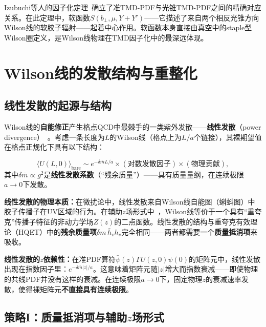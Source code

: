 \documentclass[12pt,a4paper]{ctexart}
\theoremstyle{definition}
\begin{document}
Izubuchi等人的因子化定理~\cite{Izubuchi2018}确立了准TMD-PDF与光锥TMD-PDF之间的精确对应关系。在此定理中，软函数$S(b_\perp, \mu, Y+Y')$——它描述了来自两个相反光锥方向Wilson线的软胶子辐射——起着中心作用。软函数本身直接由真空中的staple型Wilson圈定义，是Wilson线物理在TMD因子化中的最深远体现。

\section{Wilson线的发散结构与重整化}

\subsection{线性发散的起源与结构}

Wilson线的\textbf{自能修正}产生格点QCD中最棘手的一类紫外发散——\textbf{线性发散}（power divergence）~\cite{Huo2021self,Chen2018WLrenorm}。考虑一条长度为$L$的Wilson线（格点上为$L/a$个链接），其裸期望值在格点正规化下具有以下结构：

\begin{equation}
\langle U(L,0) \rangle_{\text{bare}} \sim e^{-\delta\bar{m} L/a} \times (\text{对数发散因子}) \times (\text{物理贡献}),
\label{eq:WL_bare_structure}
\end{equation}
其中$\delta\bar{m} \propto g^2$是\textbf{线性发散系数}（``残余质量''）——具有质量量纲，在连续极限$a\to 0$下发散。

\textbf{线性发散的物理本质：}在微扰论中，线性发散来自Wilson线自能图（蝌蚪图）中胶子传播子在UV区域的行为。在辅助$z$场形式中~\cite{Chen2018WLrenorm}，Wilson线等价于一个具有``重夸克''传播子特征的非动力学场$Z(z)$的二点函数。线性发散的结构与重夸克有效理论（HQET）中的\textbf{残余质量项}$\delta m \,\bar h_v h_v$完全相同——两者都需要一个\textbf{质量抵消项}来吸收。

\textbf{线性发散的$z$依赖性：}在准PDF算符$\bar\psi(z)\Gamma U(z,0)\psi(0)$的矩阵元中，线性发散出现在指数因子里：$e^{-\delta\bar{m} |z|/a}$。这意味着矩阵元随$|z|$增大而指数衰减——即使物理的共线PDF并没有这样的衰减。在连续极限$a\to 0$下，固定物理$z$的衰减速率发散，使得裸矩阵元\textbf{不直接具有连续极限}。

\subsection{策略I：质量抵消项与辅助$z$场形式}
\end{document}
